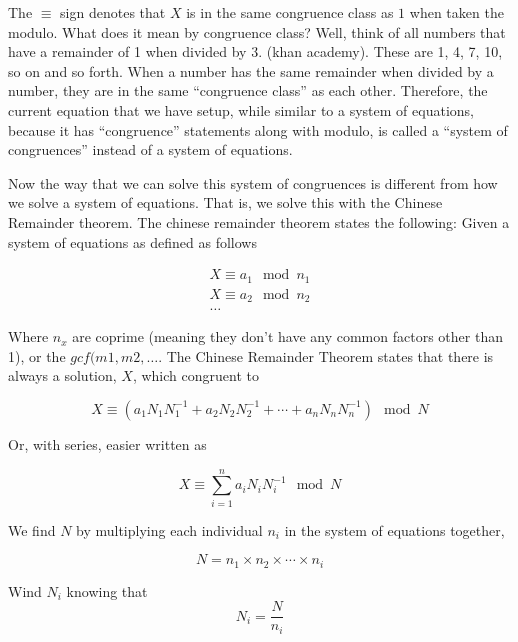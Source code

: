 \documentclass[index]{subfiles}
\begin{document}
The \(\equiv \) sign denotes that \(X\) is in the same congruence class as \(1\) when taken the modulo. What does it mean by congruence class? Well, think of all numbers that have a remainder of 1 when divided by 3. (khan academy). These are 1, 4, 7, 10, so on and so forth. When a number has the same remainder when divided by a number, they are in the same ``congruence class'' as each other. Therefore, the current equation that we have setup, while similar to a system of equations, because it has ``congruence'' statements along with modulo, is called a ``system of congruences'' instead of a system of equations.

Now the way that we can solve this system of congruences is different from how we solve a system of equations. That is, we solve this with the Chinese Remainder theorem. The chinese remainder theorem states the following: Given a system of equations as defined as follows

\begin{align*}
    X\equiv a_1\mod n_1 \\
    X\equiv a_2\mod n_2 \\
    \ldots
\end{align*}

Where \(n_x\) are coprime (meaning they don't have any common factors other than 1), or the \(gcf(m1, m2, \ldots \). The Chinese Remainder Theorem states that there is always a solution, \(X\), which congruent to

\begin{equation}
    X\equiv (a_1N_1N_1^{-1} + a_2N_2N_2^{-1} + \cdots + a_{n}N_{n}N_{n}^{-1})\mod N 
\end{equation} \cite{nesoacademyChineseRemainderTheorem2021}

Or, with series, easier written as

\begin{equation}
    X\equiv \sum_{i=1}^{n}a_{i}N_{i}N_{i}^{-1}\mod N
\end{equation}

We find \(N\) by multiplying each individual \(n_i\) in the system of equations together,

\begin{equation*}
    N=n_1\times n_2 \times \cdots \times n_i
\end{equation*}

Wind \(N_i\) knowing that 
\begin{equation*}
   N_i=\frac{N}{n_i} 
\end{equation*}
\end{document}
